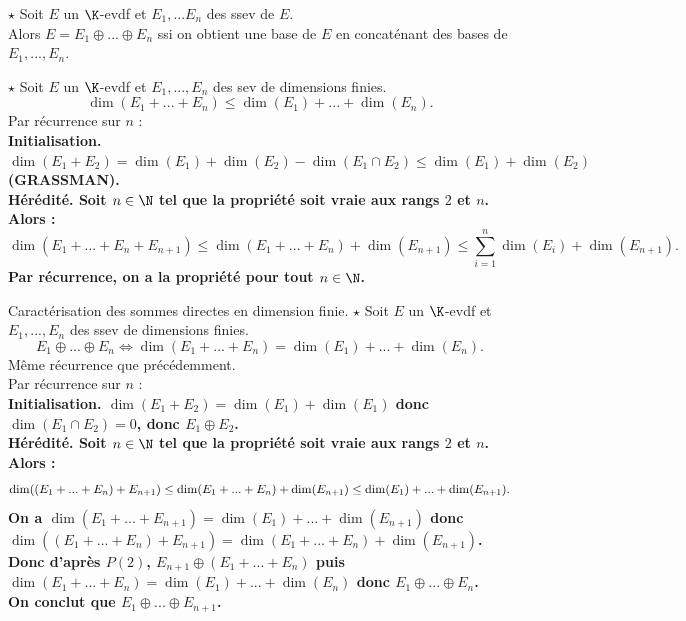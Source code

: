 \documentclass[11pt]{article}
\begin{document}
\vspace*{-0.8cm}

\begin{thm}{$\star$}{}
    Soit $E$ un $\K$-evdf et $E_1,...E_n$ des ssev de $E$.\\
    Alors $E=E_1\oplus...\oplus E_n$ ssi on obtient une base de $E$ en concaténant des bases de $E_1,...,E_n$.
\end{thm}

\begin{prop}{$\star$}{}
    Soit $E$ un $\K$-evdf et $E_1,...,E_n$ des sev de dimensions finies.
    \begin{equation*}
        \dim(E_1+...+E_n) \leq \dim(E_1) + ... + \dim(E_n).
    \end{equation*}
    \tcblower
    Par récurrence sur $n$ :\\
    \bf{Initialisation.} $\dim(E_1+E_2)=\dim(E_1)+\dim(E_2)-\dim(E_1\cap E_2) \leq \dim(E_1)+\dim(E_2)$ (GRASSMAN).\\
    \bf{Hérédité.} Soit $n\in\N$ tel que la propriété soit vraie aux rangs $2$ et $n$. Alors :
    \begin{equation*}
        \dim(E_1+...+E_n+E_{n+1})\leq \dim(E_1+...+E_n)+\dim(E_{n+1})\leq \sum_{i=1}^n\dim(E_i) + \dim(E_{n+1}).
    \end{equation*}
    Par récurrence, on a la propriété pour tout $n\in\N$.
\end{prop}

\begin{thm}{Caractérisation des sommes directes en dimension finie. $\star$}{}
    Soit $E$ un $\K$-evdf et $E_1,...,E_n$ des ssev de dimensions finies.
    \begin{equation*}
        E_1\oplus...\oplus E_n \iff \dim(E_1+...+E_n)=\dim(E_1)+...+\dim(E_n).
    \end{equation*}
    \tcblower
    \boxed{\ra} Même récurrence que précédemment.\\
    \boxed{\la} Par récurrence sur $n$ :\\
    \bf{Initialisation.} $\dim(E_1+E_2)=\dim(E_1)+\dim(E_1)$ donc $\dim(E_1\cap E_2)=0$, donc $E_1\oplus E_2$.\\
    \bf{Hérédité.} Soit $n\in\N$ tel que la propriété soit vraie aux rangs $2$ et $n$. Alors :
    \begin{equation*}
        \dim((E_1+...+E_n)+E_{n+1}) \leq \dim(E_1+...+E_n) + \dim(E_{n+1}) \leq \dim(E_1) + ... + \dim(E_{n+1}).\\
    \end{equation*}
    On a \small$\dim(E_1+...+E_{n+1})=\dim(E_1)+...+\dim(E_{n+1})$ donc $\dim((E_1+...+E_n)+E_{n+1})=\dim(E_1+...+E_n)+\dim(E_{n+1})$.\\
    Donc d'après $P(2)$, $E_{n+1}\oplus(E_1+...+E_n)$ puis $\dim(E_1+...+E_n)=\dim(E_1)+...+\dim(E_n)$ donc $E_1\oplus...\oplus E_n$.\\
    On conclut que $E_1\oplus ... \oplus E_{n+1}$.
\end{thm}
\end{document}
